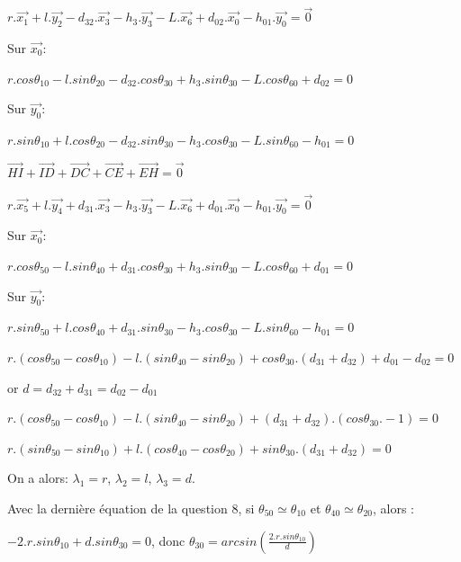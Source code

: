 $r.\overrightarrow{x_1}+l.\overrightarrow{y_2}-d_{32}.\overrightarrow{x_3}-h_3.\overrightarrow{y_3}-L.\overrightarrow{x_6}+d_{02}.\overrightarrow{x_0}-h_{01}.\overrightarrow{y_0}=\overrightarrow{0}$

\cor

Sur $\overrightarrow{x_0}$:

$r.cos\theta_{10}-l.sin\theta_{20}-d_{32}.cos\theta_{30}+h_3.sin\theta_{30}-L.cos\theta_{60}+d_{02}=0$

Sur $\overrightarrow{y_0}$:

$r.sin\theta_{10}+l.cos\theta_{20}-d_{32}.sin\theta_{30}-h_3.cos\theta_{30}-L.sin\theta_{60}-h_{01}=0$

\cor

$\overrightarrow{HI}+\overrightarrow{ID}+\overrightarrow{DC}+\overrightarrow{CE}+\overrightarrow{EH}=\overrightarrow{0}$

$r.\overrightarrow{x_5}+l.\overrightarrow{y_4}+d_{31}.\overrightarrow{x_3}-h_3.\overrightarrow{y_3}-L.\overrightarrow{x_6}+d_{01}.\overrightarrow{x_0}-h_{01}.\overrightarrow{y_0}=\overrightarrow{0}$

\cor

Sur $\overrightarrow{x_0}$:

$r.cos\theta_{50}-l.sin\theta_{40}+d_{31}.cos\theta_{30}+h_3.sin\theta_{30}-L.cos\theta_{60}+d_{01}=0$

Sur $\overrightarrow{y_0}$:

$r.sin\theta_{50}+l.cos\theta_{40}+d_{31}.sin\theta_{30}-h_3.cos\theta_{30}-L.sin\theta_{60}-h_{01}=0$

\cor

$r.(cos\theta_{50}-cos\theta_{10})-l.(sin\theta_{40}-sin\theta_{20})+cos\theta_{30}.(d_{31}+d_{32})+d_{01}-d_{02}=0$

or $d=d_{32}+d_{31}=d_{02}-d_{01}$

$r.(cos\theta_{50}-cos\theta_{10})-l.(sin\theta_{40}-sin\theta_{20})+(d_{31}+d_{32}).(cos\theta_{30}.-1)=0$

$r.(sin\theta_{50}-sin\theta_{10})+l.(cos\theta_{40}-cos\theta_{20})+sin\theta_{30}.(d_{31}+d_{32})=0$

\cor

On a alors: $\lambda_1=r$, $\lambda_2=l$, $\lambda_3=d$.

\cor

Avec la dernière équation de la question 8, si $\theta_{50}\simeq\theta_{10}$ et $\theta_{40}\simeq \theta_{20}$, alors :

$-2.r.sin\theta_{10}+d.sin\theta_{30}=0$, donc $\theta_{30}=arcsin\left(\frac{2.r.sin\theta_{10}}{d}\right)$

